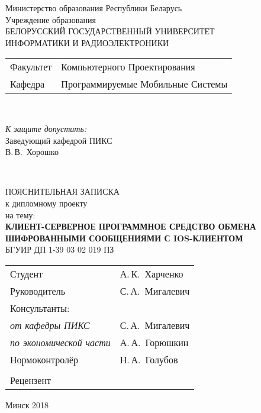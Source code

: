 \begin{titlepage}
  \begin{center}
    Министерство образования Республики Беларусь\\[1em]
    Учреждение образования\\
    БЕЛОРУССКИЙ ГОСУДАРСТВЕННЫЙ УНИВЕРСИТЕТ \\
    ИНФОРМАТИКИ И РАДИОЭЛЕКТРОНИКИ\\[1em]

    \begin{minipage}{\textwidth}
      \begin{flushleft}
        \begin{tabular}{ l l }
          Факультет & Компьютерного Проектирования\\
          Кафедра   & Программируемые Мобильные Системы
        \end{tabular}
      \end{flushleft}
    \end{minipage}\\[3em]

    \begin{flushright}
      \begin{minipage}{0.4\textwidth}
        \textit{К защите допустить:}\\[0.8em]
        Заведующий кафедрой ПИКС\\[0.45em]
        \underline{\hspace*{2.8cm}} В.\,В.~Хорошко
      \end{minipage}\\[2.2em]
    \end{flushright}

    {ПОЯСНИТЕЛЬНАЯ ЗАПИСКА}\\
    {к дипломному проекту}\\
    {на тему:}\\[1em]
    \textbf{\large\MakeUppercase{Клиент-серверное программное средство обмена шифрованными сообщениями с iOS-клиентом}}\\[1em]


    {БГУИР ДП 1-39 03 02 019 ПЗ}\\[2em]
    
    \begin{tabular}{ p{}p{} }
      Студент & А.\,К.~Харченко \\
      Руководитель & С.\,А.~Мигалевич \\
      Консультанты: &\\
      \hspace*{3ex}\emph{от кафедры ПИКС} & С.\,А.~Мигалевич \\
      \hspace*{3ex}\emph{по экономической части} & А.\,А.~Горюшкин \\
      Нормоконтролёр & Н.\,А.~Голубов\\
      & \\
      Рецензент &
    \end{tabular}
    
    \vfill
    {\normalsize Минск 2018}
  \end{center}
\end{titlepage}
